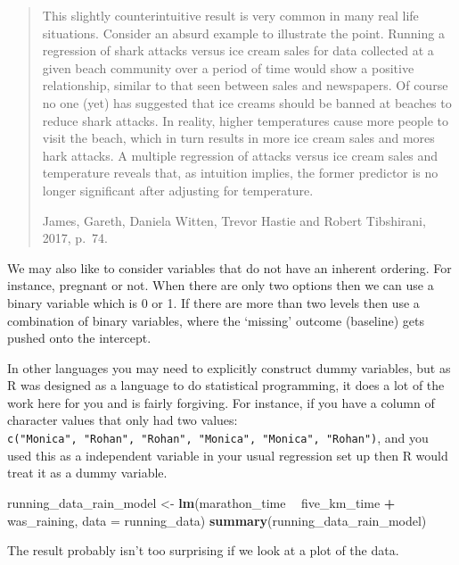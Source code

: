 \documentclass[
]{book}
\newenvironment{Shaded}{\begin{snugshade}}{\end{snugshade}}
\newcommand{\DataTypeTok}[1]{\textcolor[rgb]{0.13,0.29,0.53}{#1}}
\newcommand{\KeywordTok}[1]{\textcolor[rgb]{0.13,0.29,0.53}{\textbf{#1}}}
\newcommand{\NormalTok}[1]{#1}
\newcommand{\OperatorTok}[1]{\textcolor[rgb]{0.81,0.36,0.00}{\textbf{#1}}}
\newcommand{\StringTok}[1]{\textcolor[rgb]{0.31,0.60,0.02}{#1}}
\begin{document}
\begin{quote}
This slightly counterintuitive result is very common in many real life situations. Consider an absurd example to illustrate the point. Running a regression of shark attacks versus ice cream sales for data collected at a given beach community over a period of time would show a positive relationship, similar to that seen between sales and newspapers. Of course no one (yet) has suggested that ice creams should be banned at beaches to reduce shark attacks. In reality, higher temperatures cause more people to visit the beach, which in turn results in more ice cream sales and mores hark attacks. A multiple regression of attacks versus ice cream sales and temperature reveals that, as intuition implies, the former predictor is no longer significant after adjusting for temperature.

James, Gareth, Daniela Witten, Trevor Hastie and Robert Tibshirani, 2017, p.~74.
\end{quote}

We may also like to consider variables that do not have an inherent ordering. For instance, pregnant or not. When there are only two options then we can use a binary variable which is 0 or 1. If there are more than two levels then use a combination of binary variables, where the `missing' outcome (baseline) gets pushed onto the intercept.

In other languages you may need to explicitly construct dummy variables, but as R was designed as a language to do statistical programming, it does a lot of the work here for you and is fairly forgiving. For instance, if you have a column of character values that only had two values: \texttt{c("Monica",\ "Rohan",\ "Rohan",\ "Monica",\ "Monica",\ "Rohan")}, and you used this as a independent variable in your usual regression set up then R would treat it as a dummy variable.

\begin{Shaded}
\begin{Highlighting}[]
\NormalTok{running_data_rain_model <-}\StringTok{ }\KeywordTok{lm}\NormalTok{(marathon_time }\OperatorTok{~}\StringTok{ }\NormalTok{five_km_time }\OperatorTok{+}\StringTok{ }\NormalTok{was_raining, }
                               \DataTypeTok{data =}\NormalTok{ running_data)}
\KeywordTok{summary}\NormalTok{(running_data_rain_model)}
\end{Highlighting}
\end{Shaded}

The result probably isn't too surprising if we look at a plot of the data.
\end{document}
